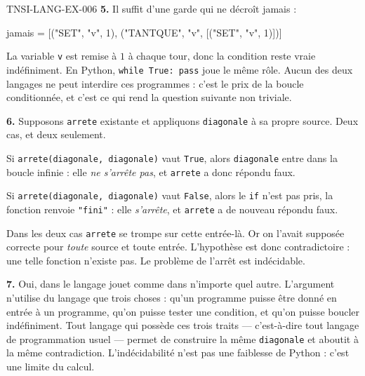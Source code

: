 \begin{corrige}{TNSI-LANG-EX-006}
\textbf{5.} Il suffit d'une garde qui ne décroît jamais :
\begin{python}
jamais = [("SET", "v", 1), ("TANTQUE", "v", [("SET", "v", 1)])]
\end{python}
La variable \lstinline{v} est remise à $1$ à chaque tour, donc la condition reste
vraie indéfiniment. En Python, \lstinline{while True: pass} joue le même rôle.
Aucun des deux langages ne peut interdire ces programmes : c'est le prix de la
boucle conditionnée, et c'est ce qui rend la question suivante non triviale.

\textbf{6.} Supposons \lstinline{arrete} existante et appliquons
\lstinline{diagonale} à sa propre source. Deux cas, et deux seulement.

Si \lstinline{arrete(diagonale, diagonale)} vaut \lstinline{True}, alors
\lstinline{diagonale} entre dans la boucle infinie : elle \emph{ne s'arrête pas},
et \lstinline{arrete} a donc répondu faux.

Si \lstinline{arrete(diagonale, diagonale)} vaut \lstinline{False}, alors le
\lstinline{if} n'est pas pris, la fonction renvoie \lstinline{"fini"} : elle
\emph{s'arrête}, et \lstinline{arrete} a de nouveau répondu faux.

Dans les deux cas \lstinline{arrete} se trompe sur cette entrée-là. Or on l'avait
supposée correcte pour \emph{toute} source et toute entrée. L'hypothèse est donc
contradictoire : une telle fonction n'existe pas. Le problème de l'arrêt est
indécidable.

\textbf{7.} Oui, dans le langage jouet comme dans n'importe quel autre. L'argument
n'utilise du langage que trois choses : qu'un programme puisse être donné en
entrée à un programme, qu'on puisse tester une condition, et qu'on puisse boucler
indéfiniment. Tout langage qui possède ces trois traits — c'est-à-dire tout
langage de programmation usuel — permet de construire la même
\lstinline{diagonale} et aboutit à la même contradiction. L'indécidabilité n'est
pas une faiblesse de Python : c'est une limite du calcul.
\end{corrige}
